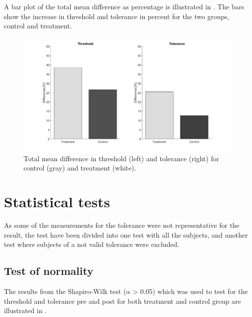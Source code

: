 A bar plot of the total mean difference as percentage is illustrated in . The bars show the increase in threshold and tolerance in percent for the two groups, control and treatment.
\begin{figure}[H]
	\includegraphics[width=1\textwidth]{figures/barplot.png} 
	\caption{Total mean difference in threshold (left) and tolerance (right) for control (gray) and treatment (white).}
	\label{fig:barplot}  
\end{figure}


\section{Statistical tests}
As some of the measurements for the tolerance were not representative for the result, the test have been divided into one test with all the subjects, and another test where subjects of a not valid tolerance were excluded.

\subsection{Test of normality}
The results from the Shapiro-Wilk test ($\alpha$ > 0.05) which was used to test for the threshold and tolerance pre and post for both treatment and control group are illustrated in .

